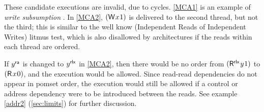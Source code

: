 These candidate executions are invalid, due to cycles.
\ref{MCA1} is an example of \emph{write subsumption}
\cite[]{DBLP:journals/pacmpl/PulteFDFSS18}.
 In \ref{MCA2}, $(\DW{x}{1})$ is delivered to the second thread, but not
the third; this is similar to the well know \iriw{} (Independent
Reads of Independent Writes) litmus test, which is also disallowed by \mca{}
architectures if the reads within each thread are ordered. 

If $y^{\mathsf{ra}}$ is changed to $y^{\mathsf{rlx}}$ in \ref{MCA2}, then there would be no order
from $(\DR[\mRLX]{y}{1})$ to $(\DR{x}{0})$, and the execution would be
allowed.  Since read-read dependencies do not appear in pomset order, the
execution would still be allowed if a control or address dependency were to
be introduced between the reads. See example \ref{addr2}
(\textsection\ref{sec:limits}) for further discussion.



